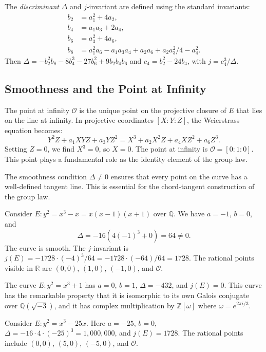 The \emph{discriminant} $\Delta$ and $j$-invariant are defined using the standard invariants:
\begin{align}
b_2 &= a_1^2 + 4a_2, \\
b_4 &= a_1 a_3 + 2a_4, \\
b_6 &= a_3^2 + 4a_6, \\
b_8 &= a_1^2 a_6 - a_1 a_3 a_4 + a_2 a_6 + a_2 a_3^2/4 - a_4^2.
\end{align}
Then $\Delta = -b_2^2 b_8 - 8b_4^3 - 27b_6^2 + 9b_2 b_4 b_6$ and $c_4 = b_2^2 - 24b_4$, with $j = c_4^3/\Delta$.

\subsection{Smoothness and the Point at Infinity}

The point at infinity $\mathcal{O}$ is the unique point on the projective closure of $E$ that lies on the line at infinity. In projective coordinates $[X : Y : Z]$, the Weierstrass equation becomes:
\[
Y^2 Z + a_1 XYZ + a_3 YZ^2 = X^3 + a_2 X^2 Z + a_4 XZ^2 + a_6 Z^3.
\]
Setting $Z = 0$, we find $X^3 = 0$, so $X = 0$. The point at infinity is $\mathcal{O} = [0 : 1 : 0]$. This point plays a fundamental role as the identity element of the group law.

The smoothness condition $\Delta \neq 0$ ensures that every point on the curve has a well-defined tangent line. This is essential for the chord-tangent construction of the group law.

\begin{example}
Consider $E: y^2 = x^3 - x = x(x-1)(x+1)$ over $\mathbb{Q}$. We have $a = -1$, $b = 0$, and
\[
\Delta = -16(4(-1)^3 + 0) = 64 \neq 0.
\]
The curve is smooth. The $j$-invariant is $j(E) = -1728 \cdot (-4)^3/64 = -1728 \cdot (-64)/64 = 1728$. The rational points visible in $\mathbb{R}$ are $(0,0)$, $(1,0)$, $(-1,0)$, and $\mathcal{O}$.
\end{example}

\begin{example}
The curve $E: y^2 = x^3 + 1$ has $a = 0$, $b = 1$, $\Delta = -432$, and $j(E) = 0$. This curve has the remarkable property that it is isomorphic to its own Galois conjugate over $\mathbb{Q}(\sqrt{-3})$, and it has complex multiplication by $\mathbb{Z}[\omega]$ where $\omega = e^{2\pi i/3}$.
\end{example}

\begin{example}
Consider $E: y^2 = x^3 - 25x$. Here $a = -25$, $b = 0$, $\Delta = -16 \cdot 4 \cdot (-25)^3 = 1{,}000{,}000$, and $j(E) = 1728$. The rational points include $(0,0)$, $(5,0)$, $(-5,0)$, and $\mathcal{O}$.
\end{example}

